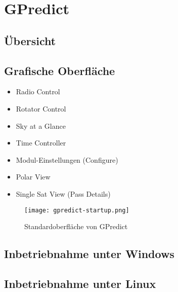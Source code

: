 
\chapter{GPredict}

\section{Übersicht}




\cite{gpredictsource}

\section{Grafische Oberfläche}

\begin{itemize}
	\parskip0pt
	\item Radio Control
	\item Rotator Control
    \item Sky at a Glance
    \item Time Controller
    \item Modul-Einstellungen (Configure)
    \item Polar View
    \item Single Sat View (Pass Details)
\end{itemize}

\clearpage

\begin{figure}[h]
	\centering
	\texttt{[image: gpredict-startup.png]}
	\caption[Standardoberfläche von GPredict]{Standardoberfläche von GPredict}
	\label{fig:gpredict-startup} 
\end{figure}

\section{Inbetriebnahme unter Windows}

\section{Inbetriebnahme unter Linux}